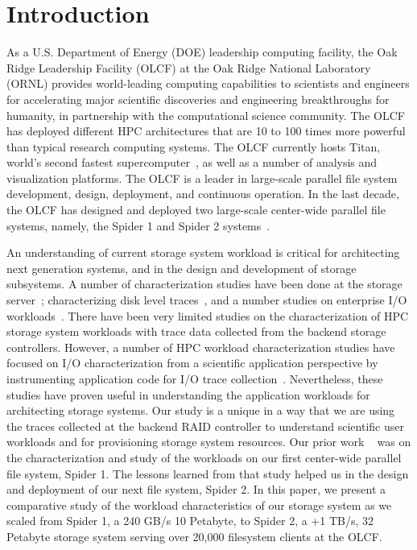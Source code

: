 \section{Introduction}
\label{sec:intro}

As a U.S. Department of Energy (DOE) leadership computing facility, the Oak
Ridge Leadership Facility (OLCF) at the Oak Ridge National Laboratory (ORNL)
provides world-leading computing capabilities to scientists and engineers for
accelerating major scientific discoveries and engineering breakthroughs for
humanity, in partnership with the computational science community. The OLCF has
deployed different HPC architectures that are 10 to 100 times more powerful
than typical research computing systems. The OLCF currently hosts Titan,
world's second fastest supercomputer~\cite{titan}, as well as a
number of analysis and visualization platforms. The OLCF is a leader in large-scale
parallel file system development, design, deployment, and continuous operation. In the
last decade, the OLCF has designed and deployed two large-scale center-wide
parallel file systems, namely, the Spider 1 and Spider 2 systems~\cite{spider1,
spider2}.

An understanding of current storage system workload is critical for
architecting next generation systems, and in the design and development of
storage subsystems. A number of characterization studies have been done at the
storage server~\cite{hpca04:zhang, iiswc08:swaroop}; characterizing disk level
traces~\cite{ sigmetrics09:alma}, and a number studies on enterprise I/O
workloads~\cite{gmach2007workload, hpca04:zhang}. There have been very limited
studies on the characterization of HPC storage system workloads with trace
data collected from the backend storage controllers. However, a number of HPC
workload characterization studies have focused on I/O characterization from a
scientific application perspective by instrumenting application code for I/O
trace collection~\cite{ iasds09:philip, shan2008characterizing}. Nevertheless,
these studies have proven useful in understanding the application workloads
for architecting storage systems. Our study is a unique in a way that we are
using the traces collected at the backend RAID controller to understand
scientific user workloads and for provisioning storage system resources. Our
prior work ~\cite{ spider1-workload} was on the characterization and study of
the workloads on our first center-wide parallel file system, Spider 1. The
lessons learned from that study helped us in the design and deployment of our
next file system, Spider 2. In this paper, we present a comparative study of
the workload characteristics of our storage system as we scaled from Spider 1,
a 240 GB/s 10 Petabyte, to Spider 2, a +1 TB/s, 32 Petabyte storage system
serving over 20,000 filesystem clients at the OLCF.

